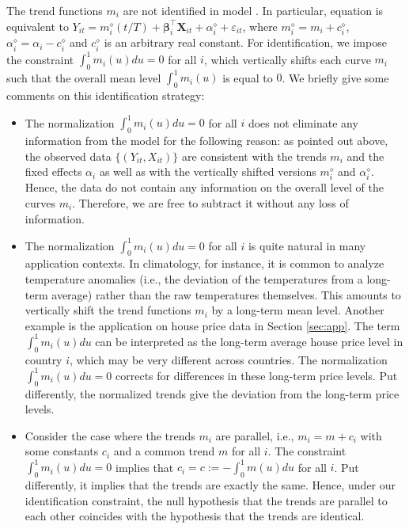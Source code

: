 \documentclass[12pt]{article}
\makeatletter
\renewcommand{\eqref}[1]{\tagform@{\ref{#1}}}
\makeatother
\begin{document}
The trend functions $m_i$ are not identified in model \eqref{eq:model_full}. In particular, equation \eqref{eq:model_full} is equivalent to $Y_{it} = m_i^\diamond(t/T) + \boldsymbol{\beta}_i^\top \boldsymbol{X}_{it} + \alpha_i^\diamond + \varepsilon_{it}$, where $m_i^\diamond = m_i + c_i^\diamond$, $\alpha_i^\diamond = \alpha_i - c_i^\diamond$ and $c_i^\diamond$ is an arbitrary real constant. For identification, we impose the constraint $\int_0^1 m_i(u) du = 0$ for all $i$, which vertically shifts each curve $m_i$ such that the overall mean level $\int_0^1 m_i(u)$ is equal to $0$. We briefly give some comments on this identification strategy:  
{\color{black}
\begin{itemize}[leftmargin=0.5cm,itemsep=0pt, parsep=0pt, topsep=3pt]

\item The normalization $\int_0^1 m_i(u) du = 0$ for all $i$ does not eliminate any information from the model for the following reason: as pointed out above, the observed data $\{(Y_{it},X_{it})\}$ are consistent with the trends $m_i$ and the fixed effects $\alpha_i$ as well as with the vertically shifted versions $m_i^\diamond$ and $\alpha_i^\diamond$. Hence, the data do not contain any information on the overall level of the curves $m_i$. Therefore, we are free to subtract it without any loss of information. 

\item The normalization $\int_0^1 m_i(u) du = 0$ for all $i$ is quite natural in many application contexts. In climatology, for instance, it is common to analyze temperature anomalies (i.e., the deviation of the temperatures from a long-term average) rather than the raw temperatures themselves. This amounts to vertically shift the trend functions $m_i$ by a long-term mean level. Another example is the application on house price data in Section \ref{sec:app}. The term $\int_0^1 m_i(u) du$ can be interpreted as the long-term average house price level in country $i$, which may be very different across countries. The normalization $\int_0^1 m_i(u) du = 0$ corrects for differences in these long-term price levels. Put differently, the normalized trends give the deviation from the long-term price levels. 

\item Consider the case where the trends $m_i$ are parallel, i.e., $m_i = m + c_i$ with some constants $c_i$ and a common trend $m$ for all $i$. The constraint $\int_0^1 m_i(u) du = 0$ implies that $c_i = c := -\int_0^1 m(u) du$ for all $i$. Put differently, it implies that the trends are exactly the same. Hence, under our identification constraint, the null hypothesis that the trends are parallel to each other coincides with the hypothesis that the trends are identical. 

\end{itemize}}
\end{document}
